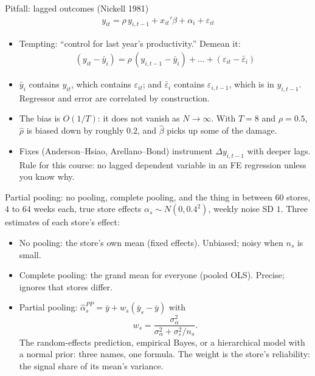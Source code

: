 \documentclass[aspectratio=169,11pt]{beamer}
\begin{document}
\begin{frame}{Pitfall: lagged outcomes (Nickell 1981)}
\begin{align*}
	y_{it} = \rho\, y_{i,t-1} + x_{it}'\beta + \alpha_i + \varepsilon_{it}
\end{align*}
\begin{itemize}
	\item Tempting: ``control for last year's productivity.'' Demean it:
	\begin{align*}
		(y_{it} - \bar y_i) = \rho\,(y_{i,t-1} - \bar y_i) + \dots + (\varepsilon_{it} - \bar\varepsilon_i)
	\end{align*}
	\item $\bar y_i$ contains $y_{it}$, which contains $\varepsilon_{it}$; and $\bar\varepsilon_i$
	contains $\varepsilon_{i,t-1}$, which is in $y_{i,t-1}$. Regressor and error are correlated
	\alert{by construction}.
	\medskip
	\item The bias is $O(1/T)$: it does not vanish as $N \to \infty$. With $T = 8$ and $\rho = 0.5$,
	$\hat\rho$ is biased down by roughly $0.2$, and $\hat\beta$ picks up some of the damage.
	\item Fixes (Anderson--Hsiao, Arellano--Bond) instrument $\Delta y_{i,t-1}$ with deeper lags.
	Rule for this course: no lagged dependent variable in an FE regression unless you know why.
\end{itemize}
\end{frame}


\begin{frame}{Partial pooling: no pooling, complete pooling, and the thing in between}
$60$ stores, $4$ to $64$ weeks each, true store effects $\alpha_s \sim N(0, 0.4^2)$, weekly noise SD $1$.
Three estimates of each store's effect:
\begin{itemize}
	\item \alert{No pooling}: the store's own mean (fixed effects). Unbiased; noisy when $n_s$ is small.
	\medskip
	\item \alert{Complete pooling}: the grand mean for everyone (pooled OLS). Precise; ignores that stores differ.
	\medskip
	\item \alert{Partial pooling}: $\hat\alpha_s^{PP} = \bar y + w_s(\bar y_s - \bar y)$ with
	\[
		w_s = \frac{\sigma^2_\alpha}{\sigma^2_\alpha + \sigma^2_\varepsilon / n_s} .
	\]
	The random-effects prediction, empirical Bayes, or a hierarchical model with a normal prior:
	three names, one formula. The weight is the store's reliability: the signal share of its mean's variance.
\end{itemize}
\end{frame}
\end{document}

